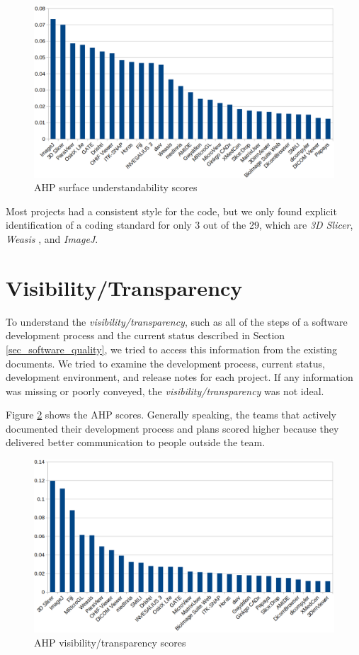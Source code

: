 \begin{figure}[H]
\includegraphics[scale=0.38]{figures/understandability_scores.png}
\caption{AHP surface understandability scores}
\label{fg_surface_understandability_scores}
\end{figure}

Most projects had a consistent style for the code, but we only found explicit identification of a coding standard for only 3 out of the 29, which are \textit{3D Slicer}, \textit{Weasis} \cite{Roduit2021}, and \textit{ImageJ}.

\section{Visibility/Transparency}

To understand the \textit{visibility/transparency}, such as all of the steps of a software development process and the current status described in Section \ref{sec_software_quality}, we tried to access this information from the existing documents. We tried to examine the development process, current status, development environment, and release notes for each project. If any information was missing or poorly conveyed, the \textit{visibility/transparency} was not ideal.

Figure \ref{fg_visibility_transparency_scores} shows the AHP scores. Generally speaking, the teams that actively documented their development process and plans scored higher because they delivered better communication to people outside the team.

\begin{figure}[H]
\includegraphics[scale=0.38]{figures/visibility_transparency_scores.png}
\caption{AHP visibility/transparency scores}
\label{fg_visibility_transparency_scores}
\end{figure}
